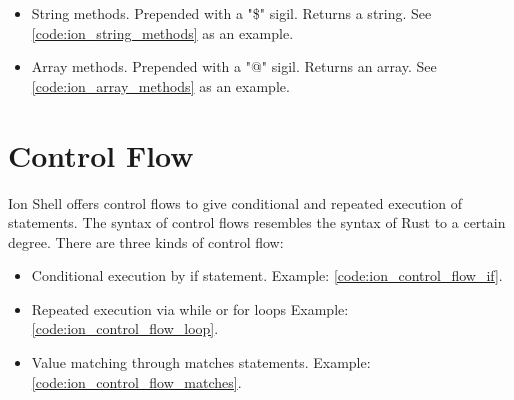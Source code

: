 \begin{itemize}
	\item String methods. Prepended with a "\$" sigil. Returns a string. See \ref{code:ion_string_methods} as an example.
	\item Array methods. Prepended with a "@" sigil. Returns an array. See \ref{code:ion_array_methods} as an example.
\end{itemize}


\clearpage

\section{Control Flow}\label{ion_shell_lang_control_flow}

Ion Shell offers control flows to give conditional and repeated execution of statements.
The syntax of control flows resembles the syntax of Rust to a certain degree.
There are three kinds of control flow:

\begin{itemize}
	\item Conditional execution by if statement. Example: \ref{code:ion_control_flow_if}.
	\item Repeated execution via while or for loops Example: \ref{code:ion_control_flow_loop}.
	\item Value matching through matches statements. Example: \ref{code:ion_control_flow_matches}.
\end{itemize}


